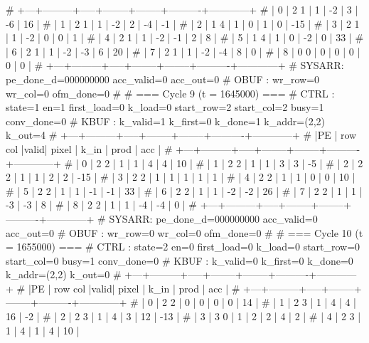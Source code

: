 # +---+---------+-----+--------+--------+----------+------------+
# | 0 |   2   1 |  1  |     -2 |      3 |       -6 |         16 |
# | 1 |   2   1 |  1  |     -2 |      2 |       -4 |         -1 |
# | 2 |   1   4 |  1  |      0 |      1 |        0 |        -15 |
# | 3 |   2   1 |  1  |     -2 |      0 |        0 |          1 |
# | 4 |   2   1 |  1  |     -2 |     -1 |        2 |          8 |
# | 5 |   1   4 |  1  |      0 |     -2 |        0 |         33 |
# | 6 |   2   1 |  1  |     -2 |     -3 |        6 |         20 |
# | 7 |   2   1 |  1  |     -2 |     -4 |        8 |          0 |
# | 8 |   0   0 |  0  |      0 |      0 |        0 |          0 |
# +---+---------+-----+--------+--------+----------+------------+
# SYSARR: pe_done_d=000000000 acc_valid=0 acc_out=0
# OBUF : wr_row=0 wr_col=0 ofm_done=0
# 
# === Cycle 9  (t = 1645000) ===
# CTRL : state=1 en=1 first_load=0 k_load=0 start_row=2 start_col=2 busy=1 conv_done=0
# KBUF : k_valid=1 k_first=0 k_done=1 k_addr=(2,2) k_out=4
# +---+---------+-----+--------+--------+----------+------------+
# |PE | row col |valid| pixel  |  k_in  |   prod   |    acc     |
# +---+---------+-----+--------+--------+----------+------------+
# | 0 |   2   2 |  1  |      1 |      4 |        4 |         10 |
# | 1 |   2   2 |  1  |      1 |      3 |        3 |         -5 |
# | 2 |   2   2 |  1  |      1 |      2 |        2 |        -15 |
# | 3 |   2   2 |  1  |      1 |      1 |        1 |          1 |
# | 4 |   2   2 |  1  |      1 |      0 |        0 |         10 |
# | 5 |   2   2 |  1  |      1 |     -1 |       -1 |         33 |
# | 6 |   2   2 |  1  |      1 |     -2 |       -2 |         26 |
# | 7 |   2   2 |  1  |      1 |     -3 |       -3 |          8 |
# | 8 |   2   2 |  1  |      1 |     -4 |       -4 |          0 |
# +---+---------+-----+--------+--------+----------+------------+
# SYSARR: pe_done_d=000000000 acc_valid=0 acc_out=0
# OBUF : wr_row=0 wr_col=0 ofm_done=0
# 
# === Cycle 10  (t = 1655000) ===
# CTRL : state=2 en=0 first_load=0 k_load=0 start_row=0 start_col=0 busy=1 conv_done=0
# KBUF : k_valid=0 k_first=0 k_done=0 k_addr=(2,2) k_out=0
# +---+---------+-----+--------+--------+----------+------------+
# |PE | row col |valid| pixel  |  k_in  |   prod   |    acc     |
# +---+---------+-----+--------+--------+----------+------------+
# | 0 |   2   2 |  0  |      0 |      0 |        0 |         14 |
# | 1 |   2   3 |  1  |      4 |      4 |       16 |         -2 |
# | 2 |   2   3 |  1  |      4 |      3 |       12 |        -13 |
# | 3 |   3   0 |  1  |      2 |      2 |        4 |          2 |
# | 4 |   2   3 |  1  |      4 |      1 |        4 |         10 |
